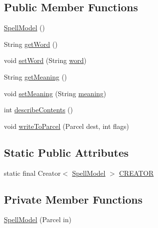 \subsection*{Public Member Functions}
\begin{DoxyCompactItemize}
\item 
\hyperlink{classorg_1_1buildmlearn_1_1toolkit_1_1learnspelling_1_1data_1_1SpellModel_a542abb6027c0ee13b336969d38f0fa6f}{Spell\+Model} ()
\item 
String \hyperlink{classorg_1_1buildmlearn_1_1toolkit_1_1learnspelling_1_1data_1_1SpellModel_ad874623bb9c9e2355cc21d56fa267974}{get\+Word} ()
\item 
void \hyperlink{classorg_1_1buildmlearn_1_1toolkit_1_1learnspelling_1_1data_1_1SpellModel_a3fb40a706a1170660c85a5cbdd1e710d}{set\+Word} (String \hyperlink{classorg_1_1buildmlearn_1_1toolkit_1_1learnspelling_1_1data_1_1SpellModel_adc2fd1639db2de59172fe451e6660c16}{word})
\item 
String \hyperlink{classorg_1_1buildmlearn_1_1toolkit_1_1learnspelling_1_1data_1_1SpellModel_a8c66d9511ecf5b5c463d786305b25ca5}{get\+Meaning} ()
\item 
void \hyperlink{classorg_1_1buildmlearn_1_1toolkit_1_1learnspelling_1_1data_1_1SpellModel_a8157437cf336c3648459fc25c216258f}{set\+Meaning} (String \hyperlink{classorg_1_1buildmlearn_1_1toolkit_1_1learnspelling_1_1data_1_1SpellModel_a536f8124344acad265bc0b8fa5e13752}{meaning})
\item 
int \hyperlink{classorg_1_1buildmlearn_1_1toolkit_1_1learnspelling_1_1data_1_1SpellModel_a49461f32ce142761afc16a5acf2dbc57}{describe\+Contents} ()
\item 
void \hyperlink{classorg_1_1buildmlearn_1_1toolkit_1_1learnspelling_1_1data_1_1SpellModel_a0578588d75a2b99f348fa1096614f4d4}{write\+To\+Parcel} (Parcel dest, int flags)
\end{DoxyCompactItemize}
\subsection*{Static Public Attributes}
\begin{DoxyCompactItemize}
\item 
static final Creator$<$ \hyperlink{classorg_1_1buildmlearn_1_1toolkit_1_1learnspelling_1_1data_1_1SpellModel}{Spell\+Model} $>$ \hyperlink{classorg_1_1buildmlearn_1_1toolkit_1_1learnspelling_1_1data_1_1SpellModel_af45eb4643be2e123379c5e259fb510a0}{C\+R\+E\+A\+T\+OR}
\end{DoxyCompactItemize}
\subsection*{Private Member Functions}
\begin{DoxyCompactItemize}
\item 
\hyperlink{classorg_1_1buildmlearn_1_1toolkit_1_1learnspelling_1_1data_1_1SpellModel_aa331f1ae66b672b3aa292bfc5a44e3df}{Spell\+Model} (Parcel in)
\end{DoxyCompactItemize}
